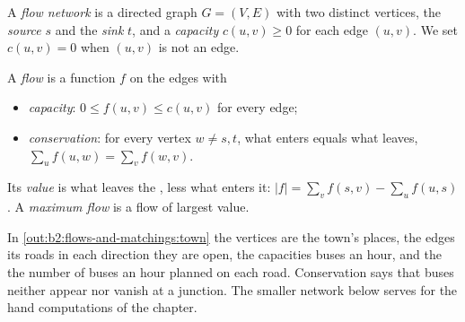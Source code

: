 \begin{definition}\label{def:b2:flows-and-matchings:network}
A \emph{flow network} is a directed graph $G = (V, E)$ with two distinct vertices, the
\emph{source} $s$ and the \emph{sink} $t$, and a
\emph{capacity} $c(u, v) \geq 0$ for each edge $(u, v)$. We set $c(u, v) = 0$ when $(u, v)$
is not an edge.
\end{definition}

\begin{definition}\label{def:b2:flows-and-matchings:flow}
A \emph{flow} is a function $f$ on the edges with
\begin{itemize}
\item \emph{capacity}: $0 \leq f(u, v) \leq c(u, v)$ for every edge;
\item \emph{conservation}: for every vertex $w \neq s, t$, what enters equals what leaves,
$\sum_{u} f(u, w) = \sum_{v} f(w, v)$.
\end{itemize}
Its \emph{value} is what leaves the , less what enters it:
$|f| = \sum_{v} f(s, v) - \sum_{u} f(u, s)$. A \emph{maximum flow} is a flow of largest value.
\end{definition}

In \cref{out:b2:flows-and-matchings:town} the vertices are the town's places, the edges its roads in each direction
they are open, the capacities buses an hour, and the  the number of buses an hour planned on each road. Conservation
says that buses neither appear nor vanish at a junction. The smaller network below serves for the hand computations of
the chapter.

\label{out:b2:flows-and-matchings:flow}

